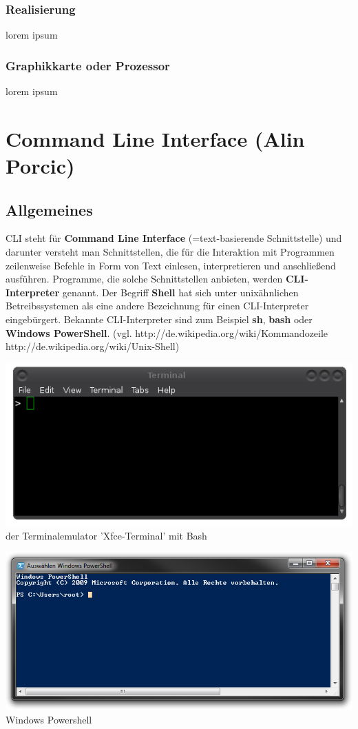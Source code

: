 \documentclass[12pt,a4paper]{report}
\begin{document}
\subsubsection{Realisierung}
lorem ipsum
\subsubsection{Graphikkarte oder Prozessor}
lorem ipsum
\newpage
\section{Command Line Interface (Alin Porcic)}
\subsection{Allgemeines}

CLI steht für \textbf{Command Line Interface} (=text-basierende Schnittstelle) und darunter versteht man Schnittstellen, die für die Interaktion mit Programmen zeilenweise Befehle in Form von Text einlesen, interpretieren und anschließend ausführen. Programme, die solche Schnittstellen anbieten, werden \textbf{CLI-Interpreter} genannt. Der Begriff \textbf{Shell} hat sich unter unixähnlichen Betreibssystemen als eine andere Bezeichnung für einen CLI-Interpreter eingebürgert. Bekannte CLI-Interpreter sind zum Beispiel \textbf{sh}, \textbf{bash} oder \textbf{Windows PowerShell}. (vgl. http://de.wikipedia.org/wiki/Kommandozeile http://de.wikipedia.org/wiki/Unix-Shell)

\begin{center}
\includegraphics[scale=0.5]{img/cli_pic.png}\\
der Terminalemulator 'Xfce-Terminal' mit Bash
\end{center}

\begin{center}
\includegraphics[scale=0.52]{img/powershell.png}\\
Windows Powershell
\end{center}
\end{document}
